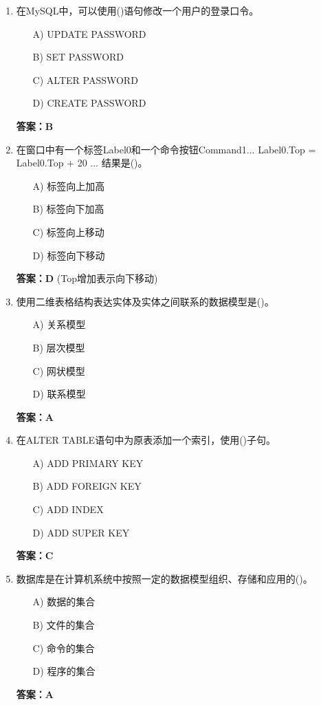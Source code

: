 \documentclass[a4paper,12pt]{article}
\begin{document}
\begin{enumerate}[label=\arabic*.]
\item 在MySQL中，可以使用()语句修改一个用户的登录口令。
\begin{itemize}
    \item[A)] UPDATE PASSWORD
    \item[B)] SET PASSWORD
    \item[C)] ALTER PASSWORD
    \item[D)] CREATE PASSWORD
\end{itemize}
\textbf{答案：B}

\item 在窗口中有一个标签Label0和一个命令按钮Command1... Label0.Top = Label0.Top + 20 ... 结果是()。
\begin{itemize}
    \item[A)] 标签向上加高
    \item[B)] 标签向下加高
    \item[C)] 标签向上移动
    \item[D)] 标签向下移动
\end{itemize}
\textbf{答案：D} (Top增加表示向下移动)

\item 使用二维表格结构表达实体及实体之间联系的数据模型是()。
\begin{itemize}
    \item[A)] 关系模型
    \item[B)] 层次模型
    \item[C)] 网状模型
    \item[D)] 联系模型
\end{itemize}
\textbf{答案：A}

\item 在ALTER TABLE语句中为原表添加一个索引，使用()子句。
\begin{itemize}
    \item[A)] ADD PRIMARY KEY
    \item[B)] ADD FOREIGN KEY
    \item[C)] ADD INDEX
    \item[D)] ADD SUPER KEY
\end{itemize}
\textbf{答案：C}

\item 数据库是在计算机系统中按照一定的数据模型组织、存储和应用的()。
\begin{itemize}
    \item[A)] 数据的集合
    \item[B)] 文件的集合
    \item[C)] 命令的集合
    \item[D)] 程序的集合
\end{itemize}
\textbf{答案：A}


\end{enumerate}
\end{document}
